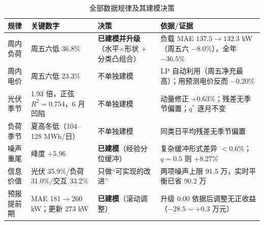 \begin{table}[htbp]
\centering
\caption{全部数据规律及其建模决策}
\label{tab:patterns}
\begin{tabularx}{\textwidth}{@{}p{2.5cm}p{3.6cm}p{2.4cm}X@{}}
\toprule
规律 & 关键数字 & 决策 & 依据/证据 \\
\midrule
周内负荷 & 周五六低 36.8\% & \textbf{已建模并升级}（水平$\times$形状 + 分类凸组合\nobreak） & 负载 MAE $137.5\to132.3$ kW（周五六 $-8.0\%$\nobreak）\nobreak，全年 $-36.5\text{\%}$ \\
周内电价 & 周五六低 23.3\% & 不单独建模 & LP 自动利用（周五净充最高\nobreak）\nobreak；用预测电价反而 $-0.20\text{\%}$ \\
光伏季节 & 1.93 倍\nobreak，正弦 $R^2=0.754$\nobreak，6 月凹陷 & 不单独建模 & 动量修正 $+0.63\text{\%}$\nobreak；残差无季节偏置\nobreak；$q^*$ 逐月不变 \\
负荷季节 & 夏高冬低（104--128 MWh/日\nobreak） & 不单独建模 & 同类日平均残差无季节偏置 \\
噪声重尾 & 峰度 $+5.96$ & \textbf{已建模}（经验分位缓冲\nobreak） & 复杂缓冲形式差异 $<0.6\text{\%}$\nobreak；$q=0.5$ 则 $+8.27\text{\%}$ \\
信息价值 & 光伏 35.9\%/负荷 31.0\%/交互 33.2\% & 只做“可实现的改进\nobreak” & 两项噪声上限 91.5 万\nobreak，实时平衡已省 90.2 万 \\
预报提前期 & MAE 181$\to$260 kW\nobreak；更新 273 kW & \textbf{已建模}（滚动调整\nobreak） & 升级 0:00 依据后调整无正收益（$-28.5\sim+0.3$ 万元\nobreak） \\
\bottomrule
\end{tabularx}
\end{table}
